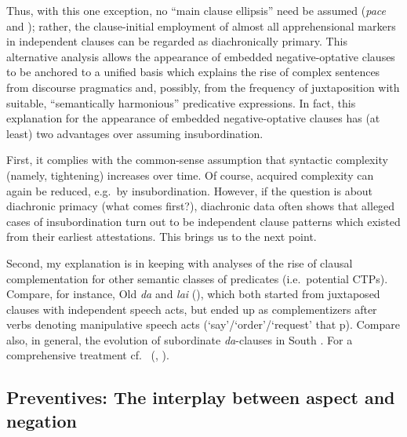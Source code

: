 \documentclass[output=paper,colorlinks,citecolor=brown]{langscibook}
\begin{document}
Thus, with this one exception, no ``main clause ellipsis'' need be assumed (\textit{pace} \citealt{Dobrushina2006wiemer} and \citealt{evans2007insubordination}); rather, the clause-initial employment of almost all apprehensional markers in independent clauses can be regarded as diachronically primary. This alternative analysis allows the appearance of embedded negative-optative clauses to be anchored to a unified basis which explains the rise of complex sentences from discourse pragmatics and, possibly, from the frequency of juxtaposition with suitable, ``semantically harmonious'' predicative expressions. In fact, this explanation for the appearance of embedded negative-optative clauses has (at least) two advantages over assuming insubordination.

First, it complies with the common-sense assumption that syntactic complexity (namely, tightening) increases over time. Of course, acquired complexity can again be reduced, e.g.\ by insubordination. However, if the question is about diachronic primacy (what comes first?), diachronic data often shows that alleged cases of insubordination turn out to be independent clause patterns which existed from their earliest attestations. This brings us to the next point.

Second, my explanation is in keeping with analyses of the rise of clausal complementation for other semantic classes of predicates (i.e.\ potential CTPs). Compare, for instance, Old  \textit{da} \citep[198]{Grković-Major2004} and  \textit{lai} (\citealt[237, 253, 260]{Holvoet2016}), which both started from juxtaposed clauses with independent speech acts, but ended up as complementizers after verbs denoting manipulative speech acts (`say'/`order'/`request' that p). Compare also, in general, the evolution of subordinate \textit{da}-clauses in South . For a comprehensive treatment cf.\ \citeauthor{Wiemer2017} (\citeyear[297--300, 313--315]{Wiemer2017}, \citeyear{Wiemer2019}).




\subsection{Preventives: The interplay between aspect and negation}
\label{subsec:preventives}
\end{document}
